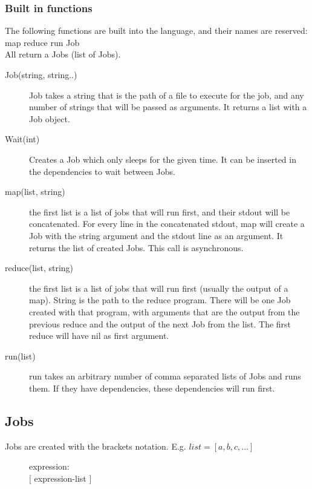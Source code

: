 \documentclass[12pt]{article}
\begin{document}
\subsubsection{Built in functions}
The following functions are built into the language, and their names are reserved:\\
map reduce run Job\\
All return a Jobs (list of Jobs).
\begin{description}
  \item[Job(string, string..)] Job takes a string that is the path of a file to
    execute for the job, and any number of strings that will be passed as
    arguments. It returns a list with a Job object.
  \item[Wait(int)] Creates a Job which only sleeps for the given time. It can be inserted
  in the dependencies to wait between Jobs.
  \item[map(list, string)] the first list is a list of jobs that will run first, and their
    stdout will be concatenated. For every line in the concatenated stdout, map will create
    a Job with the string argument and the stdout line as an argument. It returns the list
    of created Jobs. This call is asynchronous.
  \item[reduce(list, string)] the first list is a list of jobs that will run first (usually the
    output of a map). String is the path to the reduce program. There will be one Job
    created with that program, with arguments that are the output from the previous reduce and
    the output of the next Job from the list. The first reduce will have nil as first argument.
  \item[run(list)] run takes an arbitrary number of comma separated lists of Jobs
    and runs them. If they have dependencies, these dependencies will run first.
\end{description}

\subsection{Jobs}
Jobs are created with the brackets notation. E.g. $list = [a, b, c, ...]$
\begin{description}
  \item[]expression: \hfill \\
    $[$ expression-list $]$
\end{description}
\end{document}
